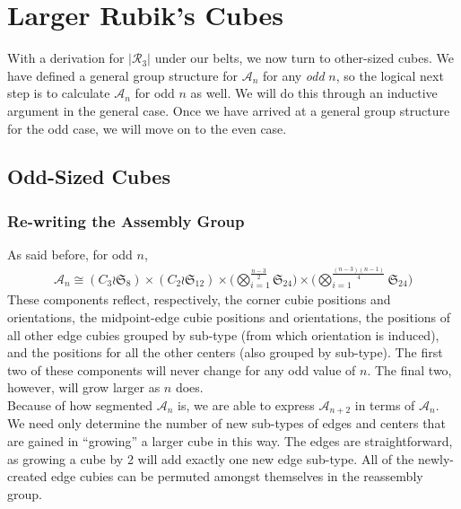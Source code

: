 \documentclass[10pt,letterpaper]{report}
\begin{document}
\chapter{Larger Rubik's Cubes}
With a derivation for $|\mathcal{R}_3|$ under our belts, we now turn to other-sized cubes.  We have defined a general group structure for $\mathcal{A}_n$ for any \textit{odd} $n$, so the logical next step is to  calculate $\mathcal{A}_n$ for odd $n$ as well.  We will do this through an inductive argument in the general case.  Once we have arrived at a general group structure for the odd case, we will move on to the even case.

\section{Odd-Sized Cubes}
\subsection{Re-writing the Assembly Group}
As said before, for odd $n$,
\begin{align*}
\mathcal{A}_n \cong 
(C_3 \wr \mathfrak{S}_8) \times (C_2 \wr \mathfrak{S}_{12}) \times \Big( \bigotimes_{i=1}^{\frac{n-3}{2}}\mathfrak{S}_{24} \Big) \times \Big( \bigotimes_{i=1}^{\frac{(n-3)(n-1)}{4}}\mathfrak{S}_{24} \Big)
\end{align*}
These components reflect, respectively, the corner cubie positions and orientations, the midpoint-edge cubie positions and orientations, the positions of all other edge cubies grouped by sub-type (from which orientation is induced), and the positions for all the other centers (also grouped by sub-type).  The first two of these components will never change for any odd value of $n$.  The final two, however, will grow larger as $n$ does. \\

Because of how segmented $\mathcal{A}_n$ is, we are able to express $\mathcal{A}_{n+2}$ in terms of $\mathcal{A}_n$.  We need only determine the number of new sub-types of edges and centers that are gained in ``growing'' a larger cube in this way.  The edges are straightforward, as growing a cube by 2 will add exactly one new edge sub-type.  All of the newly-created edge cubies can be permuted amongst themselves in the reassembly group.  \\
\end{document}
